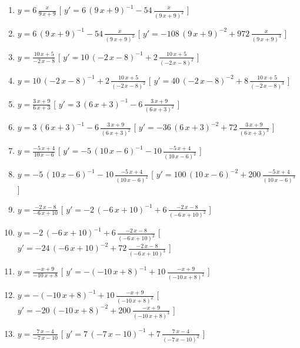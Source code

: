 \begin{esercizio}
\begin{enumerate}
\item $y= 6\,{\frac {x}{9\,x+9}} $ \hfill [ $y'= 6\, \left( 9\,x+9 \right) ^{-1}-54\,{\frac {x}{ \left( 9\,x+9 \right) ^{2}}}$ ]
\item $y= 6\, \left( 9\,x+9 \right) ^{-1}-54\,{\frac {x}{ \left( 9\,x+9 \right) ^{2}}} $ \hfill [ $y'= -108\, \left( 9\,x+9 \right) ^{-2}+972\,{\frac {x}{ \left( 9\,x+9 \right) ^{3}}}$ ]
\item $y= {\frac {10\,x+5}{-2\,x-8}} $ \hfill [ $y'= 10\, \left( -2\,x-8 \right) ^{-1}+2\,{\frac {10\,x+5}{ \left( -2\,x-8 \right) ^{2}}}$ ]
\item $y= 10\, \left( -2\,x-8 \right) ^{-1}+2\,{\frac {10\,x+5}{ \left( -2\,x-8 \right) ^{2}}} $ \hfill [ $y'= 40\, \left( -2\,x-8 \right) ^{-2}+8\,{\frac {10\,x+5}{ \left( -2\,x-8 \right) ^{3}}}$ ]
\item $y= {\frac {3\,x+9}{6\,x+3}} $ \hfill [ $y'= 3\, \left( 6\,x+3 \right) ^{-1}-6\,{\frac {3\,x+9}{ \left( 6\,x+3 \right) ^{2}}}$ ]
\item $y= 3\, \left( 6\,x+3 \right) ^{-1}-6\,{\frac {3\,x+9}{ \left( 6\,x+3 \right) ^{2}}} $ \hfill [ $y'= -36\, \left( 6\,x+3 \right) ^{-2}+72\,{\frac {3\,x+9}{ \left( 6\,x+3 \right) ^{3}}}$ ]
\item $y= {\frac {-5\,x+4}{10\,x-6}} $ \hfill [ $y'= -5\, \left( 10\,x-6 \right) ^{-1}-10\,{\frac {-5\,x+4}{ \left( 10\,x-6 \right) ^{2}}}$ ]
\item $y= -5\, \left( 10\,x-6 \right) ^{-1}-10\,{\frac {-5\,x+4}{ \left( 10\,x-6 \right) ^{2}}} $ \hfill [ $y'= 100\, \left( 10\,x-6 \right) ^{-2}+200\,{\frac {-5\,x+4}{ \left( 10\,x-6 \right) ^{3}}}$ ]
\item $y= {\frac {-2\,x-8}{-6\,x+10}} $ \hfill [ $y'= -2\, \left( -6\,x+10 \right) ^{-1}+6\,{\frac {-2\,x-8}{ \left( -6\,x+10 \right) ^{2}}}$ ]
\item $y= -2\, \left( -6\,x+10 \right) ^{-1}+6\,{\frac {-2\,x-8}{ \left( -6\,x+10 \right) ^{2}}} $ \hfill [ $y'= -24\, \left( -6\,x+10 \right) ^{-2}+72\,{\frac {-2\,x-8}{ \left( -6\,x+10 \right) ^{3}}}$ ]
\item $y= {\frac {-x+9}{-10\,x+8}} $ \hfill [ $y'= - \left( -10\,x+8 \right) ^{-1}+10\,{\frac {-x+9}{ \left( -10\,x+8 \right) ^{2}}}$ ]
\item $y= - \left( -10\,x+8 \right) ^{-1}+10\,{\frac {-x+9}{ \left( -10\,x+8 \right) ^{2}}} $ \hfill [ $y'= -20\, \left( -10\,x+8 \right) ^{-2}+200\,{\frac {-x+9}{ \left( -10\,x+8 \right) ^{3}}}$ ]
\item $y= {\frac {7\,x-4}{-7\,x-10}} $ \hfill [ $y'= 7\, \left( -7\,x-10 \right) ^{-1}+7\,{\frac {7\,x-4}{ \left( -7\,x-10 \right) ^{2}}}$ ]

\end{enumerate}
\end{esercizio}
